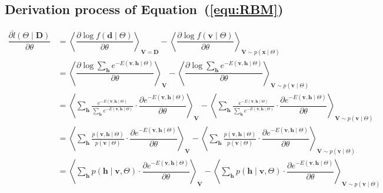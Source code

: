 \documentclass[11pt,twoside,a4paper]{article}
\begin{document}
\begin{appendices}
	\section{Derivation process of Equation~(\ref{equ:RBM})  }
	\label{app:RBM}
	\begin{equation}
		\begin{aligned}
		\dfrac{\partial \hat{l} (\Theta \mid \mathbf{D})}{\partial \theta} 
		& = \left \langle \dfrac{\partial \log f(\mathbf{d} \mid \Theta)}{\partial \theta}\right \rangle_{\mathbf{V=D}} -\left \langle \dfrac{\partial \log f(\mathbf{v} \mid \Theta)}{\partial \theta}\right \rangle_{\mathbf{V} \sim p(\mathbf{x} \mid \Theta)}  \\
		& = \left \langle \dfrac{\partial \log \sum_{ \mathbf{h}} e^{-E(\mathbf{v}, \mathbf{h} \mid \Theta)}}{\partial \theta}\right \rangle_{\mathbf{V}} 
		-\left \langle \dfrac{\partial \log \sum_{ \mathbf{h}} e^{-E(\mathbf{v}, \mathbf{h} \mid \Theta)} }{\partial \theta}\right \rangle_{\mathbf{V} \sim p(\mathbf{v} \mid \Theta)}  \\
		& = \left \langle \sum_{ \mathbf{h}} \frac{e^{-E(\mathbf{v}, \mathbf{h} \mid \Theta)}}{\sum_{ \mathbf{h}} e^{-E(\mathbf{v}, \mathbf{h} \mid \Theta)}} \cdot \dfrac{\partial e^{-E(\mathbf{v}, \mathbf{h} \mid \Theta)}}{\partial \theta} \right \rangle_{\mathbf{V}} 
		- \left \langle \sum_{ \mathbf{h}} \frac{e^{-E(\mathbf{v}, \mathbf{h} \mid \Theta)}}{\sum_{ \mathbf{h}} e^{-E(\mathbf{v}, \mathbf{h} \mid \Theta)}} \cdot \dfrac{\partial e^{-E(\mathbf{v}, \mathbf{h} \mid \Theta)}}{\partial \theta} \right \rangle_{\mathbf{V} \sim p(\mathbf{v} \mid \Theta)}  \\
		& = \left \langle \sum_{ \mathbf{h}} \frac{p(\mathbf{v}, \mathbf{h} \mid \Theta)}{p(\mathbf{v} \mid \Theta)} \cdot \dfrac{\partial e^{-E(\mathbf{v}, \mathbf{h} \mid \Theta)}}{\partial \theta} \right \rangle_{\mathbf{V}} 
		- \left \langle \sum_{ \mathbf{h}}  \frac{p(\mathbf{v}, \mathbf{h} \mid \Theta)}{p(\mathbf{v} \mid \Theta)} \cdot \dfrac{\partial e^{-E(\mathbf{v}, \mathbf{h} \mid \Theta)}}{\partial \theta} \right \rangle_{\mathbf{V} \sim p(\mathbf{v} \mid \Theta)}  \\
		& = \left \langle \sum_{ \mathbf{h}} p( \mathbf{h} \mid \mathbf{v}, \Theta) \cdot \dfrac{\partial e^{-E(\mathbf{v}, \mathbf{h} \mid \Theta)}}{\partial \theta} \right \rangle_{\mathbf{V}} 
		- \left \langle \sum_{ \mathbf{h}} p( \mathbf{h} \mid \mathbf{v}, \Theta) \cdot \dfrac{\partial e^{-E(\mathbf{v}, \mathbf{h} \mid \Theta)}}{\partial \theta} \right \rangle_{\mathbf{V} \sim p(\mathbf{v} \mid \Theta)}  \\

\end{aligned}
\end{equation}
\end{appendices}
\end{document}
